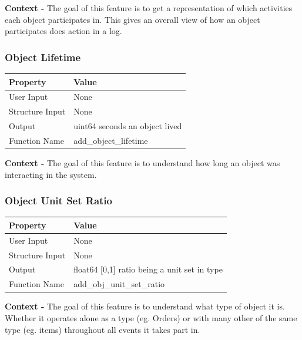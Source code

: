 \documentclass{article}
\begin{document}
\textbf{Context -} The goal of this feature is to get a representation of which activities each object participates in. This gives an overall view of how an object participates does action in a log.\\

\subsubsection{Object Lifetime}
\begin{center}
	\begin{tabular}{| p{3cm} p{7cm} |}
		\hline
		\textbf{Property} & \textbf{Value}\\
		\hline
		User Input & None\\
		Structure Input & None\\
		Output & uint64 seconds an object lived\\
		Function Name & add\_object\_lifetime\\
		\hline
	\end{tabular}
\end{center}

\textbf{Context -} The goal of this feature is to understand how long an object was interacting in the system.\\

\subsubsection{Object Unit Set Ratio}
\begin{center}
	\begin{tabular}{| p{3cm} p{7cm} |}
		\hline
		\textbf{Property} & \textbf{Value}\\
		\hline
		User Input & None\\
		Structure Input & None\\
		Output & float64 [0,1] ratio being a unit set in type\\
		Function Name & add\_obj\_unit\_set\_ratio\\
		\hline
	\end{tabular}
\end{center}

\textbf{Context -} The goal of this feature is to understand what type of object it is. Whether it operates alone as a type (eg. Orders) or with many other of the same type (eg. items) throughout all events it takes part in.
\\
\end{document}
